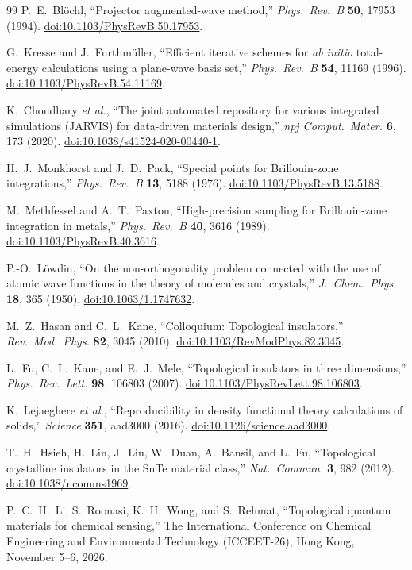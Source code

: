 \documentclass[11pt]{article}
\begin{document}
\begin{thebibliography}{99}
P.~E.~Bl\"ochl,
``Projector augmented-wave method,''
\textit{Phys.\ Rev.\ B} \textbf{50}, 17953 (1994).
\href{https://doi.org/10.1103/PhysRevB.50.17953}{doi:10.1103/PhysRevB.50.17953}.

G.~Kresse and J.~Furthm\"uller,
``Efficient iterative schemes for \textit{ab initio} total-energy calculations using a
plane-wave basis set,''
\textit{Phys.\ Rev.\ B} \textbf{54}, 11169 (1996).
\href{https://doi.org/10.1103/PhysRevB.54.11169}{doi:10.1103/PhysRevB.54.11169}.

K.~Choudhary \textit{et al.},
``The joint automated repository for various integrated simulations (JARVIS) for
data-driven materials design,''
\textit{npj Comput.\ Mater.} \textbf{6}, 173 (2020).
\href{https://doi.org/10.1038/s41524-020-00440-1}{doi:10.1038/s41524-020-00440-1}.

H.~J.~Monkhorst and J.~D.~Pack,
``Special points for Brillouin-zone integrations,''
\textit{Phys.\ Rev.\ B} \textbf{13}, 5188 (1976).
\href{https://doi.org/10.1103/PhysRevB.13.5188}{doi:10.1103/PhysRevB.13.5188}.

M.~Methfessel and A.~T.~Paxton,
``High-precision sampling for Brillouin-zone integration in metals,''
\textit{Phys.\ Rev.\ B} \textbf{40}, 3616 (1989).
\href{https://doi.org/10.1103/PhysRevB.40.3616}{doi:10.1103/PhysRevB.40.3616}.

P.-O.~L\"owdin,
``On the non-orthogonality problem connected with the use of atomic wave functions in
the theory of molecules and crystals,''
\textit{J.\ Chem.\ Phys.} \textbf{18}, 365 (1950).
\href{https://doi.org/10.1063/1.1747632}{doi:10.1063/1.1747632}.

M.~Z.~Hasan and C.~L.~Kane,
``Colloquium: Topological insulators,''
\textit{Rev.\ Mod.\ Phys.} \textbf{82}, 3045 (2010).
\href{https://doi.org/10.1103/RevModPhys.82.3045}{doi:10.1103/RevModPhys.82.3045}.

L.~Fu, C.~L.~Kane, and E.~J.~Mele,
``Topological insulators in three dimensions,''
\textit{Phys.\ Rev.\ Lett.} \textbf{98}, 106803 (2007).
\href{https://doi.org/10.1103/PhysRevLett.98.106803}{doi:10.1103/PhysRevLett.98.106803}.

K.~Lejaeghere \textit{et al.},
``Reproducibility in density functional theory calculations of solids,''
\textit{Science} \textbf{351}, aad3000 (2016).
\href{https://doi.org/10.1126/science.aad3000}{doi:10.1126/science.aad3000}.

T.~H.~Hsieh, H.~Lin, J.~Liu, W.~Duan, A.~Bansil, and L.~Fu,
``Topological crystalline insulators in the SnTe material class,''
\textit{Nat.\ Commun.} \textbf{3}, 982 (2012).
\href{https://doi.org/10.1038/ncomms1969}{doi:10.1038/ncomms1969}.

P.~C.~H.~Li, S.~Roonasi, K.~H.~Wong, and S.~Rehmat,
``Topological quantum materials for chemical sensing,''
The International Conference on Chemical Engineering and Environmental Technology (ICCEET-26),
Hong Kong, November 5--6, 2026.

\end{thebibliography}
\end{document}
